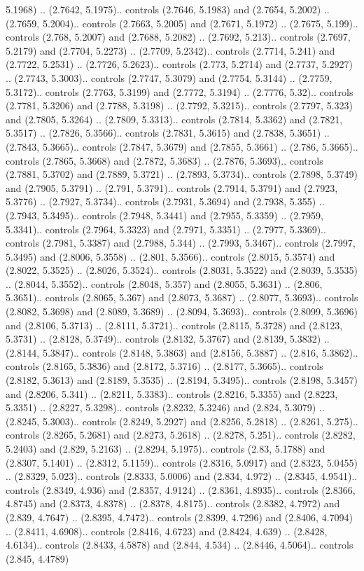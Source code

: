 5.1968) .. (2.7642, 5.1975).. controls (2.7646, 5.1983) and (2.7654, 5.2002) .. (2.7659, 5.2004).. controls (2.7663, 5.2005) and (2.7671, 5.1972) .. (2.7675, 5.199).. controls (2.768, 5.2007) and (2.7688, 5.2082) .. (2.7692, 5.213).. controls (2.7697, 5.2179) and (2.7704, 5.2273) .. (2.7709, 5.2342).. controls (2.7714, 5.241) and (2.7722, 5.2531) .. (2.7726, 5.2623).. controls (2.773, 5.2714) and (2.7737, 5.2927) .. (2.7743, 5.3003).. controls (2.7747, 5.3079) and (2.7754, 5.3144) .. (2.7759, 5.3172).. controls (2.7763, 5.3199) and (2.7772, 5.3194) .. (2.7776, 5.32).. controls (2.7781, 5.3206) and (2.7788, 5.3198) .. (2.7792, 5.3215).. controls (2.7797, 5.323) and (2.7805, 5.3264) .. (2.7809, 5.3313).. controls (2.7814, 5.3362) and (2.7821, 5.3517) .. (2.7826, 5.3566).. controls (2.7831, 5.3615) and (2.7838, 5.3651) .. (2.7843, 5.3665).. controls (2.7847, 5.3679) and (2.7855, 5.3661) .. (2.786, 5.3665).. controls (2.7865, 5.3668) and (2.7872, 5.3683) .. (2.7876, 5.3693).. controls (2.7881, 5.3702) and (2.7889, 5.3721) .. (2.7893, 5.3734).. controls (2.7898, 5.3749) and (2.7905, 5.3791) .. (2.791, 5.3791).. controls (2.7914, 5.3791) and (2.7923, 5.3776) .. (2.7927, 5.3734).. controls (2.7931, 5.3694) and (2.7938, 5.355) .. (2.7943, 5.3495).. controls (2.7948, 5.3441) and (2.7955, 5.3359) .. (2.7959, 5.3341).. controls (2.7964, 5.3323) and (2.7971, 5.3351) .. (2.7977, 5.3369).. controls (2.7981, 5.3387) and (2.7988, 5.344) .. (2.7993, 5.3467).. controls (2.7997, 5.3495) and (2.8006, 5.3558) .. (2.801, 5.3566).. controls (2.8015, 5.3574) and (2.8022, 5.3525) .. (2.8026, 5.3524).. controls (2.8031, 5.3522) and (2.8039, 5.3535) .. (2.8044, 5.3552).. controls (2.8048, 5.357) and (2.8055, 5.3631) .. (2.806, 5.3651).. controls (2.8065, 5.367) and (2.8073, 5.3687) .. (2.8077, 5.3693).. controls (2.8082, 5.3698) and (2.8089, 5.3689) .. (2.8094, 5.3693).. controls (2.8099, 5.3696) and (2.8106, 5.3713) .. (2.8111, 5.3721).. controls (2.8115, 5.3728) and (2.8123, 5.3731) .. (2.8128, 5.3749).. controls (2.8132, 5.3767) and (2.8139, 5.3832) .. (2.8144, 5.3847).. controls (2.8148, 5.3863) and (2.8156, 5.3887) .. (2.816, 5.3862).. controls (2.8165, 5.3836) and (2.8172, 5.3716) .. (2.8177, 5.3665).. controls (2.8182, 5.3613) and (2.8189, 5.3535) .. (2.8194, 5.3495).. controls (2.8198, 5.3457) and (2.8206, 5.341) .. (2.8211, 5.3383).. controls (2.8216, 5.3355) and (2.8223, 5.3351) .. (2.8227, 5.3298).. controls (2.8232, 5.3246) and (2.824, 5.3079) .. (2.8245, 5.3003).. controls (2.8249, 5.2927) and (2.8256, 5.2818) .. (2.8261, 5.275).. controls (2.8265, 5.2681) and (2.8273, 5.2618) .. (2.8278, 5.251).. controls (2.8282, 5.2403) and (2.829, 5.2163) .. (2.8294, 5.1975).. controls (2.83, 5.1788) and (2.8307, 5.1401) .. (2.8312, 5.1159).. controls (2.8316, 5.0917) and (2.8323, 5.0455) .. (2.8329, 5.023).. controls (2.8333, 5.0006) and (2.834, 4.972) .. (2.8345, 4.9541).. controls (2.8349, 4.936) and (2.8357, 4.9124) .. (2.8361, 4.8935).. controls (2.8366, 4.8745) and (2.8373, 4.8378) .. (2.8378, 4.8175).. controls (2.8382, 4.7972) and (2.839, 4.7647) .. (2.8395, 4.7472).. controls (2.8399, 4.7296) and (2.8406, 4.7094) .. (2.8411, 4.6908).. controls (2.8416, 4.6723) and (2.8424, 4.639) .. (2.8428, 4.6134).. controls (2.8433, 4.5878) and (2.844, 4.534) .. (2.8446, 4.5064).. controls (2.845, 4.4789) 